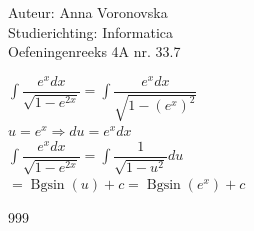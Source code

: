 \documentclass[a4paper]{article}
\begin{document}
  
\noindent \large Auteur: Anna Voronovska \\
\noindent \large Studierichting: Informatica\\
\noindent \large Oefeningenreeks 4A nr. 33.7\\

\medskip

\normalsize

$\displaystyle\int\dfrac{e^xdx}{\sqrt{1-e^{2x}}} = \displaystyle\int\dfrac{e^xdx}{\sqrt{1-(e^x)^2}}$\\

$u = e^x \Rightarrow du = e^xdx$\\

$\displaystyle\int\dfrac{e^xdx}{\sqrt{1-e^{2x}}} = \displaystyle\int\dfrac{1}{\sqrt{1-u^2}}du$\\

$= \operatorname{Bgsin}(u) + c = \operatorname{Bgsin}(e^x) + c$\\

\begin{thebibliography}{999}
\end{thebibliography}
\end{document}
